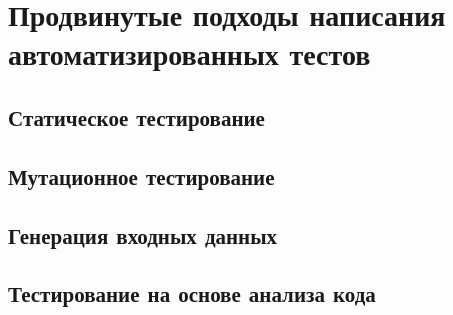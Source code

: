 \section{Продвинутые подходы написания автоматизированных тестов} 



\subsection{Статическое тестирование} 

 

\subsection{Мутационное тестирование} 
 
 

\subsection{Генерация входных данных} 
 
 

\subsection{Тестирование на основе анализа кода} 
 
 
